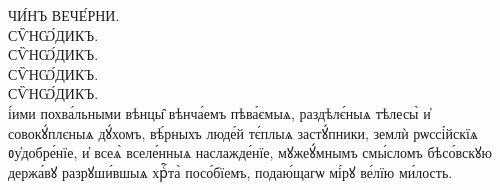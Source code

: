 \documentclass{article}
\begin{document}
{\Huge \simple ЧИ́НЪ ВЕЧЕ́РНИ.} \\

{\Huge \glyphfont СѶНѠ́ДИКЪ.} \\

{\Huge \simple СѶНѠ́ДИКЪ.} \\

{\Huge \simple\salt СѶНѠ́ДИКЪ.} \\

{\Huge \simple\salta СѶНѠ́ДИКЪ.} \\

{і́ими похва́льными вѣнцы̑ вѣнча́емъ пѣва́ємыѧ, раздѣлє́ныѧ тѣлесы̀ и҆ совокꙋ́плєныѧ дꙋ́хомъ, вѣ́рныхъ люде́й тє́плыѧ застꙋ́пники, землѝ рѡссі́йскїѧ ᲂу҆добре́нїе, и҆ всеѧ̀ вселе́нныѧ наслажде́нїе, мꙋжеꙋ́мнымъ смы́сломъ бѣсо́вскꙋю держа́вꙋ разрꙋши́вшыѧ хрⷭ҇та̀ посо́бїемъ, подаю́щагѡ мі́рꙋ ве́лїю ми́лость. }
\end{document}
